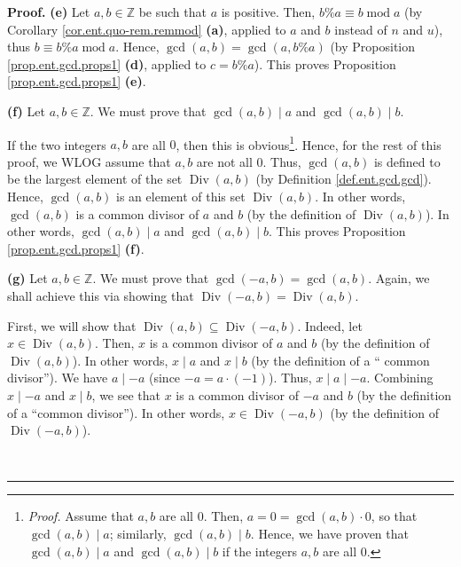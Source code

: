 \documentclass[numbers=enddot,12pt,final,onecolumn,notitlepage]{scrartcl}%
\numberwithin{exer}{subsection}
\theoremstyle{definition}
\newenvironment{proof}[1][Proof]{\noindent\textbf{#1.} }{\ \rule{0.5em}{0.5em}}
\begin{document}
\begin{proof}
\textbf{(e)} Let $a,b\in\mathbb{Z}$ be such that $a$ is positive. Then,
$b\%a\equiv b\operatorname{mod}a$ (by Corollary \ref{cor.ent.quo-rem.remmod}
\textbf{(a)}, applied to $a$ and $b$ instead of $n$ and $u$), thus $b\equiv
b\%a\operatorname{mod}a$. Hence, $\gcd\left(  a,b\right)  =\gcd\left(
a,b\%a\right)  $ (by Proposition \ref{prop.ent.gcd.props1} \textbf{(d)},
applied to $c=b\%a$). This proves Proposition \ref{prop.ent.gcd.props1}
\textbf{(e)}.

\textbf{(f)} Let $a,b\in\mathbb{Z}$. We must prove that $\gcd\left(
a,b\right)  \mid a$ and $\gcd\left(  a,b\right)  \mid b$.

If the two integers $a,b$ are all $0$, then this is
obvious\footnote{\textit{Proof.} Assume that $a,b$ are all $0$. Then,
$a=0=\gcd\left(  a,b\right)  \cdot0$, so that $\gcd\left(  a,b\right)  \mid
a$; similarly, $\gcd\left(  a,b\right)  \mid b$. Hence, we have proven that
$\gcd\left(  a,b\right)  \mid a$ and $\gcd\left(  a,b\right)  \mid b$ if the
integers $a,b$ are all $0$.}. Hence, for the rest of this proof, we WLOG
assume that $a,b$ are not all $0$. Thus, $\gcd\left(  a,b\right)  $ is defined
to be the largest element of the set $\operatorname*{Div}\left(  a,b\right)  $
(by Definition \ref{def.ent.gcd.gcd}). Hence, $\gcd\left(  a,b\right)  $ is an
element of this set $\operatorname*{Div}\left(  a,b\right)  $. In other words,
$\gcd\left(  a,b\right)  $ is a common divisor of $a$ and $b$ (by the
definition of $\operatorname*{Div}\left(  a,b\right)  $). In other words,
$\gcd\left(  a,b\right)  \mid a$ and $\gcd\left(  a,b\right)  \mid b$. This
proves Proposition \ref{prop.ent.gcd.props1} \textbf{(f)}.

\textbf{(g)} Let $a,b\in\mathbb{Z}$. We must prove that $\gcd\left(
-a,b\right)  =\gcd\left(  a,b\right)  $. Again, we shall achieve this via
showing that $\operatorname*{Div}\left(  -a,b\right)  =\operatorname*{Div}%
\left(  a,b\right)  $.

First, we will show that $\operatorname*{Div}\left(  a,b\right)
\subseteq\operatorname*{Div}\left(  -a,b\right)  $. Indeed, let $x\in
\operatorname*{Div}\left(  a,b\right)  $. Then, $x$ is a common divisor of $a$
and $b$ (by the definition of $\operatorname*{Div}\left(  a,b\right)  $). In
other words, $x\mid a$ and $x\mid b$ (by the definition of a \textquotedblleft
common divisor\textquotedblright). We have $a\mid-a$ (since $-a=a\cdot\left(
-1\right)  $). Thus, $x\mid a\mid-a$. Combining $x\mid-a$ and $x\mid b$, we
see that $x$ is a common divisor of $-a$ and $b$ (by the definition of a
\textquotedblleft common divisor\textquotedblright). In other words,
$x\in\operatorname*{Div}\left(  -a,b\right)  $ (by the definition of
$\operatorname*{Div}\left(  -a,b\right)  $).


\end{proof}
\end{document}
